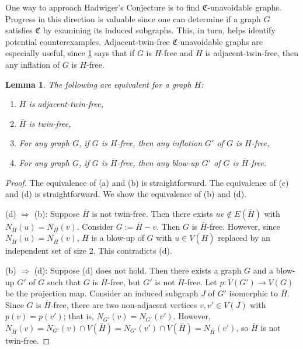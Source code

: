 \documentclass[11pt]{article}
\numberwithin{equation}{section}
\theoremstyle{plain}
\newtheorem{lem}[equation]{Lemma}
\theoremstyle{definition}
\begin{document}
One way to approach Hadwiger's Conjecture is to find $\mathfrak{C}$-unavoidable graphs. Progress in this direction is valuable since one can determine if a graph $G$ satisfies $\mathfrak{C}$ by examining its induced subgraphs. This, in turn, helps identify potential counterexamples. Adjacent-twin-free $\mathfrak{C}$-unavoidable graphs are especially useful, since \cref{lem:blow_up_avoidant} says that if $G$ is $H$-free and $H$ is adjacent-twin-free, then any inflation of $G$ is $H$-free.
\begin{lem}
    \label{lem:blow_up_avoidant}
    The following are equivalent for a graph $H$:
    \begin{enumerate}[(\alph*)]
        \item $H$ is adjacent-twin-free,
        \item $\overline{H}$ is twin-free,
        \item For any graph $G$, if $G$ is $H$-free, then any inflation $G'$ of $G$ is $H$-free,
        \item For any graph $G$, if $G$ is $\overline{H}$-free, then any blow-up $G'$ of $G$ is $\overline{H}$-free.
    \end{enumerate}
\end{lem}
\begin{proof}
    The equivalence of (a) and (b) is straightforward. The equivalence of (c) and (d) is straightforward. We show the equivalence of (b) and (d).

    (d) $\Rightarrow $ (b): Suppose $\overline{H}$ is not twin-free. Then there exists $uv \notin E(\overline{H})$ with $N_{\overline{H}}(u) = N_{\overline{H}}(v)$. Consider $G := \overline{H} - v$. Then $G$ is $\overline{H}$-free. However, since $N_{\overline{H}}(u) = N_{\overline{H}}(v)$, $\overline{H}$ is a blow-up of $G$ with $u \in V(\overline{H})$ replaced by an independent set of size $2$. This contradicts (d).

    (b) $\Rightarrow$ (d): Suppose (d) does not hold. Then there exists a graph $G$ and a blow-up $G'$ of $G$ such that $G$ is $\overline{H}$-free, but $G'$ is not $\overline{H}$-free. Let $p: V(G') \to V(G)$ be the projection map. Consider an induced subgraph $J$ of $G'$ isomorphic to $\overline{H}$. Since $G$ is $\overline{H}$-free, there are two non-adjacent vertices $v, v' \in V(J)$ with $p(v) = p(v')$; that is, $N_{G'}(v) = N_{G'}(v')$. However, $N_{\overline{H}}(v) = N_{G'}(v) \cap V(\overline{H}) = N_{G'}(v') \cap V(\overline{H}) = N_{\overline{H}}(v')$, so $\overline{H}$ is not twin-free.
\end{proof}
\end{document}
